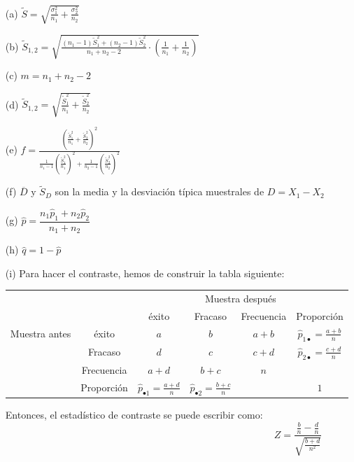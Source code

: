 \documentclass{article}
\begin{document}
\begin{itemize}
\item[(a)] $\widetilde{S}=\displaystyle
\sqrt{\frac{\sigma_1^2}{n_1}+
\frac{\sigma_2^2}{n_2}}$

\item[(b)] $\displaystyle\widetilde{S}_{1,2}=\sqrt{\frac{(n_1
-1)\widetilde{S}_1^2 +(n_2 -1)\widetilde{S}_2^2}{n_1 +n_2
-2}\cdot\left(\frac{1}{n_1}+\frac{1}{n_2}\right)}$

\item[(c)] $m=n_1+n_2-2$

\item[(d)] $\displaystyle\widetilde{S}_{1,2}=\sqrt{\frac{\widetilde{S}_1^2}{n_1}+\frac{\widetilde{S}_2^2}{n_2}}$

\item[(e)] $f=\displaystyle\frac{\left(\frac{\widetilde{S}_1^2}{n_1}+\frac{\widetilde{S}_2^2}{n_2}\right)^2}%
{ \frac{1}{n_1-1}\left(\frac{\widetilde{S}_1^2}{n_1}\right)^2+\frac{1}{n_2-1}\left(\frac{\widetilde{S}_2^2}{n_2}\right)^2}$

\item[(f)] $\overline{D}$ y $\widetilde{S}_D$ son la media y la desviación típica muestrales de $D=X_1-X_2$

\item[(g)] $\widehat{p}=\dfrac{n_1 \widehat{p}_1 +n_2\widehat{p}_2}{n_1 +n_2}$

\item[(h)] $\widehat{q}=1-\widehat{p}$

\item[(i)] Para hacer el contraste, hemos de construir la tabla siguiente:
\begin{center}
\begin{tabular}{|c|c|c|c|c|c|}
\cline{3-6}
\multicolumn{1}{c}{} & \multicolumn{1}{c|}{} &\multicolumn{4}{c|}{Muestra después}\\
\cline{3-6} 
\multicolumn{1}{c}{}& \multicolumn{1}{c|}{} & éxito & Fracaso & Frecuencia & Proporción 
\\\cline{1-6}\cline{2-6}
\multirow{4}{2cm}{Muestra antes}&
 éxito & $a$ & $b$ & $a+b$ & $\widehat{p}_{1\bullet}=
\frac{a+b}{n}$\\\cline{2-6}
& Fracaso & $d$ & $c$ & $c+d$ & $\widehat{p}_{2\bullet}=
\frac{c+d}{n}$\\
\cline{2-6}\cline{2-6}
& Frecuencia & $a+d$ & $b+c$ & $n$ & \\\cline{2-6}
& Proporción & $\widehat{p}_{\bullet 1}=\frac{a+d}{n}$ & 
$\widehat{p}_{\bullet 2}=\frac{b+c}{n}$ & & $1$ \\\cline{1-6}
\end{tabular}
\end{center}
Entonces, el estadístico de contraste se puede escribir como:
$$Z=\frac{\frac{b}{n}-\frac{d}{n}}{\sqrt{\frac{b+d}{n^2}}}$$
\end{itemize}
\end{document}
